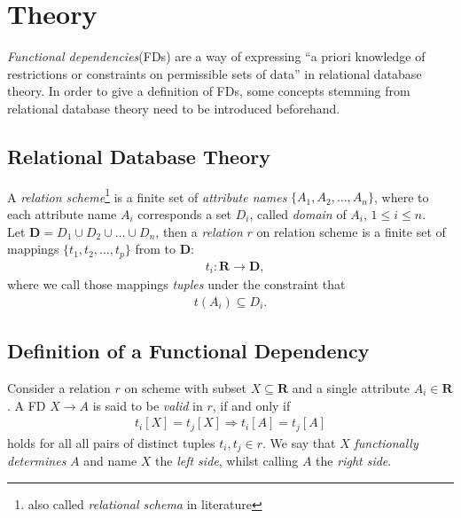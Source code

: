 \newpage
\section{Theory}
\emph{Functional dependencies}(FDs) are a way of expressing ``a priori knowledge of restrictions or constraints on permissible sets of data''\cite[p.42]{MAI83} in relational database theory.
In order to give a definition of FDs, some concepts stemming from relational database theory need to be introduced beforehand.

\subsection{Relational Database Theory}
A \emph{relation scheme}\footnote{also called \emph{relational schema} in literature\cite[p.21]{ABE19}}  is a finite set of \emph{attribute names} $\{A_1, A_2, \dots, A_n\}$, where to each attribute name $A_i$ corresponds a set $D_i$, called \emph{domain} of $A_i$, $1 \leq i \leq n$. \\

Let $\boldsymbol{D} = D_1 \cup D_2 \cup \dots \cup D_n$, then a \emph{relation} $r$ on relation scheme  is a finite set of mappings $\{t_1, t_2, \dots, t_p\}$ from  to $\boldsymbol{D}$:
\begin{align}
  &t_i: \boldsymbol{R} \to \boldsymbol{D},
\end{align}
where we call those mappings \emph{tuples} under the constraint that \cite[p.2]{MAI83}
\begin{align}
  t(A_i) \subseteq D_i.
\end{align}

\subsection{Definition of a Functional Dependency}
Consider a relation $r$ on scheme  with subset $X \subseteq \boldsymbol{R}$ and a single attribute $A_i \in \boldsymbol{R}$.
A FD $X \to A$ is said to be \emph{valid} in $r$, if and only if
\begin{align}\label{eq:fd-condition}
  t_i[X] = t_j[X] \Rightarrow t_i[A] = t_j[A]
\end{align}
holds for all all pairs of distinct tuples $t_i,t_j \in r$.\cite[p.~21]{ABE19} 
We say that $X$ \emph{functionally determines} $A$\cite[p.~43]{MAI83} and name $X$ the \emph{left side}, whilst calling $A$ the \emph{right side}.

